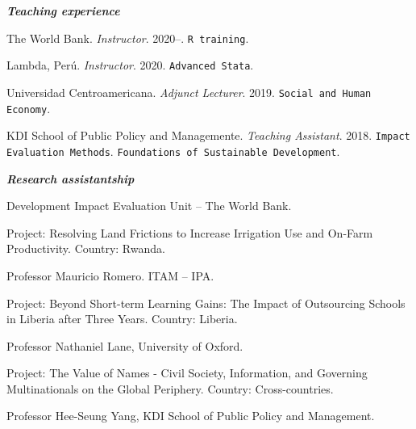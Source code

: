 \documentclass[11pt,article,oneside, a4paper]{memoir}
\begin{document}
\medskip
\noindent\emph{\textbf{Teaching experience} \vspace{0.05in}}

\ind The World Bank. \emph{Instructor}. 2020--. \newline \texttt{R training}.

\ind Lambda, Perú. \emph{Instructor}. 2020. \newline \texttt{Advanced Stata}. 

\ind Universidad Centroamericana. \emph{Adjunct Lecturer}. 2019. \newline \texttt{Social and Human Economy}.  

\ind KDI School of Public Policy and Managemente. \emph{Teaching Assistant}. 2018.  \newline \texttt{Impact Evaluation Methods}. \newline \texttt{Foundations of Sustainable Development}. 

\medskip
\noindent\emph{\textbf{Research assistantship} \vspace{0.05in}}

\ind Development Impact Evaluation Unit -- The World Bank. 

\ind \hspace{0.35in} \footnotesize Project: Resolving Land Frictions to Increase Irrigation Use and On-Farm Productivity. \newline Country: Rwanda. \normalsize \vspace{0.01in}

\ind Professor Mauricio Romero. ITAM -- IPA.

\ind \hspace{0.35in} \footnotesize Project: Beyond Short-term Learning Gains: The Impact of Outsourcing Schools in Liberia after
Three Years. \newline Country: Liberia. \normalsize \vspace{0.01in}

\ind Professor Nathaniel Lane, University of Oxford.

\ind \hspace{0.35in} \footnotesize Project: The Value of Names - Civil Society, Information, and Governing Multinationals on the
Global Periphery. \newline Country: Cross-countries. \normalsize \vspace{0.01in}

\ind Professor Hee-Seung Yang, KDI School of Public Policy and Management.
\end{document}
